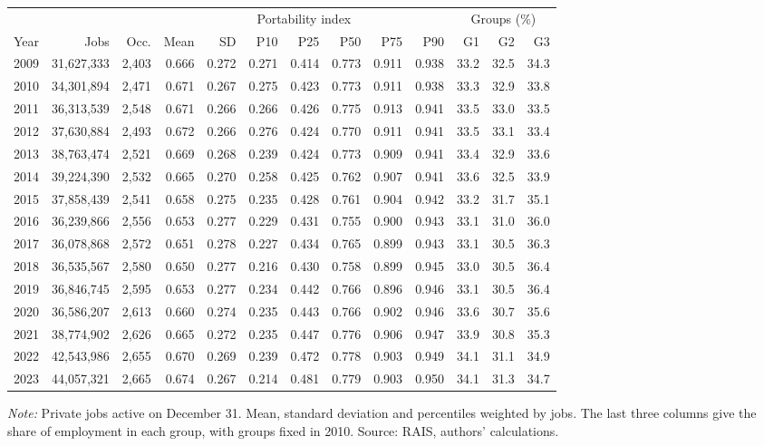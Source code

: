 {\footnotesize
\begin{threeparttable}
\begin{tabular}{lrrrrrrrrrrrr}
\toprule
 & & & \multicolumn{7}{c}{Portability index} & \multicolumn{3}{c}{Groups (\%)} \\
\cmidrule(lr){4-10}\cmidrule(lr){11-13}
Year & Jobs & Occ. & Mean & SD & P10 & P25 & P50 & P75 & P90 & G1 & G2 & G3 \\
\midrule
2009 & 31,627,333 & 2,403 & 0.666 & 0.272 & 0.271 & 0.414 & 0.773 & 0.911 & 0.938 & 33.2 & 32.5 & 34.3 \\
2010 & 34,301,894 & 2,471 & 0.671 & 0.267 & 0.275 & 0.423 & 0.773 & 0.911 & 0.938 & 33.3 & 32.9 & 33.8 \\
2011 & 36,313,539 & 2,548 & 0.671 & 0.266 & 0.266 & 0.426 & 0.775 & 0.913 & 0.941 & 33.5 & 33.0 & 33.5 \\
2012 & 37,630,884 & 2,493 & 0.672 & 0.266 & 0.276 & 0.424 & 0.770 & 0.911 & 0.941 & 33.5 & 33.1 & 33.4 \\
2013 & 38,763,474 & 2,521 & 0.669 & 0.268 & 0.239 & 0.424 & 0.773 & 0.909 & 0.941 & 33.4 & 32.9 & 33.6 \\
2014 & 39,224,390 & 2,532 & 0.665 & 0.270 & 0.258 & 0.425 & 0.762 & 0.907 & 0.941 & 33.6 & 32.5 & 33.9 \\
2015 & 37,858,439 & 2,541 & 0.658 & 0.275 & 0.235 & 0.428 & 0.761 & 0.904 & 0.942 & 33.2 & 31.7 & 35.1 \\
2016 & 36,239,866 & 2,556 & 0.653 & 0.277 & 0.229 & 0.431 & 0.755 & 0.900 & 0.943 & 33.1 & 31.0 & 36.0 \\
2017 & 36,078,868 & 2,572 & 0.651 & 0.278 & 0.227 & 0.434 & 0.765 & 0.899 & 0.943 & 33.1 & 30.5 & 36.3 \\
2018 & 36,535,567 & 2,580 & 0.650 & 0.277 & 0.216 & 0.430 & 0.758 & 0.899 & 0.945 & 33.0 & 30.5 & 36.4 \\
2019 & 36,846,745 & 2,595 & 0.653 & 0.277 & 0.234 & 0.442 & 0.766 & 0.896 & 0.946 & 33.1 & 30.5 & 36.4 \\
2020 & 36,586,207 & 2,613 & 0.660 & 0.274 & 0.235 & 0.443 & 0.766 & 0.902 & 0.946 & 33.6 & 30.7 & 35.6 \\
2021 & 38,774,902 & 2,626 & 0.665 & 0.272 & 0.235 & 0.447 & 0.776 & 0.906 & 0.947 & 33.9 & 30.8 & 35.3 \\
2022 & 42,543,986 & 2,655 & 0.670 & 0.269 & 0.239 & 0.472 & 0.778 & 0.903 & 0.949 & 34.1 & 31.1 & 34.9 \\
2023 & 44,057,321 & 2,665 & 0.674 & 0.267 & 0.214 & 0.481 & 0.779 & 0.903 & 0.950 & 34.1 & 31.3 & 34.7 \\
\bottomrule
\end{tabular}
\begin{tablenotes}[flushleft]\footnotesize
\item \textit{Note:} Private jobs active on December 31. Mean, standard deviation and percentiles weighted by jobs. The last three columns give the share of employment in each group, with groups fixed in 2010. Source: RAIS, authors' calculations.
\end{tablenotes}
\end{threeparttable}
}
